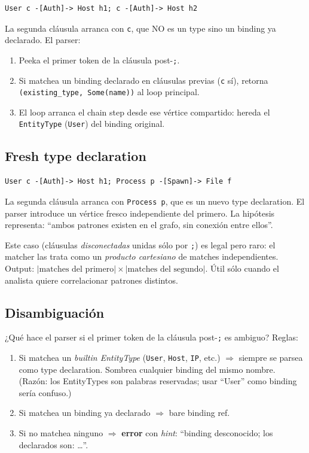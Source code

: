 \begin{lstlisting}
User c -[Auth]-> Host h1; c -[Auth]-> Host h2
\end{lstlisting}

\noindent
La segunda cláusula arranca con \texttt{c}, que NO es un type sino
un binding ya declarado. El parser:

\begin{enumerate}
    \item Peeka el primer token de la cláusula post-\texttt{;}.
    \item Si matchea un binding declarado en cláusulas previas
    (\texttt{c} sí), retorna \texttt{(existing\_type, Some(name))}
    al loop principal.
    \item El loop arranca el chain step desde ese vértice
    compartido: hereda el \texttt{EntityType} (\texttt{User}) del
    binding original.
\end{enumerate}

\subsection{Fresh type declaration}

\begin{lstlisting}
User c -[Auth]-> Host h1; Process p -[Spawn]-> File f
\end{lstlisting}

\noindent
La segunda cláusula arranca con \texttt{Process p}, que es un nuevo
type declaration. El parser introduce un vértice fresco
independiente del primero. La hipótesis representa: ``ambos
patrones existen en el grafo, sin conexión entre ellos''.

\begin{nota}
Este caso (cláusulas \emph{disconectadas} unidas sólo por
\texttt{;}) es legal pero raro: el matcher las trata como un
\emph{producto cartesiano} de matches independientes. Output:
$|\text{matches del primero}| \times |\text{matches del segundo}|$.
Útil sólo cuando el analista quiere correlacionar patrones
distintos.
\end{nota}

\subsection{Disambiguación}

¿Qué hace el parser si el primer token de la cláusula post-\texttt{;}
es ambiguo? Reglas:

\begin{enumerate}
    \item Si matchea un \emph{builtin EntityType}
    (\texttt{User}, \texttt{Host}, \texttt{IP}, etc.) $\Rightarrow$
    siempre se parsea como type declaration. Sombrea cualquier
    binding del mismo nombre. (Razón: los EntityTypes son
    palabras reservadas; usar ``User'' como binding sería
    confuso.)
    \item Si matchea un binding ya declarado $\Rightarrow$ bare
    binding ref.
    \item Si no matchea ninguno $\Rightarrow$ \textbf{error} con
    \emph{hint}: ``binding desconocido; los declarados son: \dots''.
\end{enumerate}

